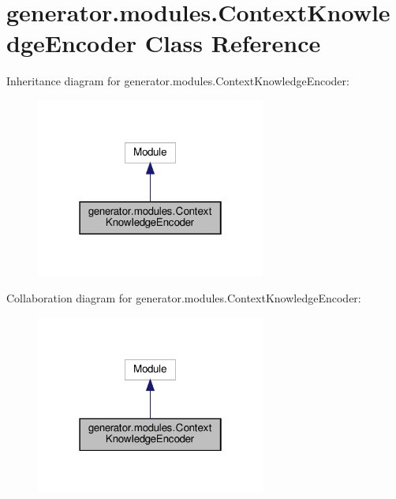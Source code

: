 \hypertarget{classgenerator_1_1modules_1_1ContextKnowledgeEncoder}{}\section{generator.\+modules.\+Context\+Knowledge\+Encoder Class Reference}
\label{classgenerator_1_1modules_1_1ContextKnowledgeEncoder}


Inheritance diagram for generator.\+modules.\+Context\+Knowledge\+Encoder\+:
\nopagebreak
\begin{figure}[H]
\begin{center}
\leavevmode
\includegraphics[width=214pt]{classgenerator_1_1modules_1_1ContextKnowledgeEncoder__inherit__graph}
\end{center}
\end{figure}


Collaboration diagram for generator.\+modules.\+Context\+Knowledge\+Encoder\+:
\nopagebreak
\begin{figure}[H]
\begin{center}
\leavevmode
\includegraphics[width=214pt]{classgenerator_1_1modules_1_1ContextKnowledgeEncoder__coll__graph}
\end{center}
\end{figure}
